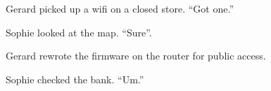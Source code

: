 

Gerard picked up a wifi on a closed store.  ``Got one.''

Sophie looked at the map.  ``Sure''.

Gerard rewrote the firmware on the router for public access.

Sophie checked the bank.  ``Um.''

\bye
